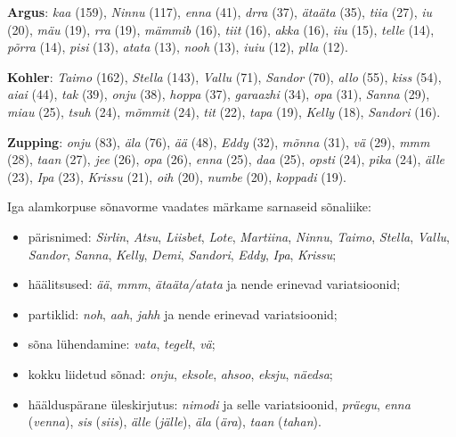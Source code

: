 \documentclass[12pt]{article}
\begin{document}
\textbf{Argus}: \emph{kaa} (159), \emph{Ninnu} (117), \emph{enna} (41), \emph{drra} (37), \emph{ätaäta} (35), \emph{tiia} (27), \emph{iu} (20), \emph{mäu} (19), \emph{rra} (19), \emph{mämmib} (16), \emph{tiit} (16), \emph{akka} (16), \emph{iiu} (15), \emph{telle} (14), \emph{põrra} (14), \emph{pisi} (13), \emph{atata} (13), \emph{nooh} (13), \emph{iuiu} (12), \emph{plla} (12).

\textbf{Kohler}: \emph{Taimo} (162), \emph{Stella} (143), \emph{Vallu} (71), \emph{Sandor} (70), \emph{allo} (55), \emph{kiss} (54), \emph{aiai} (44), \emph{tak} (39), \emph{onju} (38), \emph{hoppa} (37), \emph{garaazhi} (34), \emph{opa} (31), \emph{Sanna} (29), \emph{miau} (25), \emph{tsuh} (24), \emph{mõmmit} (24), \emph{tit} (22), \emph{tapa} (19), \emph{Kelly} (18), \emph{Sandori} (16).

\textbf{Zupping}: \emph{onju} (83), \emph{äla} (76), \emph{ää} (48), \emph{Eddy} (32), \emph{mõnna} (31), \emph{vä} (29), \emph{mmm} (28), \emph{taan} (27), \emph{jee} (26), \emph{opa} (26), \emph{enna} (25), \emph{daa} (25), \emph{opsti} (24), \emph{pika} (24), \emph{älle} (23), \emph{Ipa} (23), \emph{Krissu} (21), \emph{oih} (20), \emph{numbe} (20), \emph{koppadi} (19).

Iga alamkorpuse sõnavorme vaadates märkame sarnaseid sõnaliike:

\begin{itemize}
    \item pärisnimed: \emph{Sirlin}, \emph{Atsu}, \emph{Liisbet}, \emph{Lote}, \emph{Martiina}, \emph{Ninnu}, \emph{Taimo}, \emph{Stella}, \emph{Vallu}, \emph{Sandor}, \emph{Sanna}, \emph{Kelly}, \emph{Demi}, \emph{Sandori}, \emph{Eddy}, \emph{Ipa}, \emph{Krissu};
    \item häälitsused: \emph{ää}, \emph{mmm}, \emph{ätaäta/atata} ja nende erinevad variatsioonid;
    \item partiklid: \emph{noh}, \emph{aah}, \emph{jahh} ja nende erinevad variatsioonid;
    \item sõna lühendamine: \emph{vata}, \emph{tegelt}, \emph{vä};
    \item kokku liidetud sõnad: \emph{onju}, \emph{eksole}, \emph{ahsoo}, \emph{eksju}, \emph{näedsa};
    \item häälduspärane üleskirjutus: \emph{nimodi} ja selle variatsioonid, \emph{präegu}, \emph{enna} (\emph{venna}), \emph{sis} (\emph{siis}), \emph{älle} (\emph{jälle}), \emph{äla} (\emph{ära}), \emph{taan} (\emph{tahan}).
\end{itemize}
\end{document}
